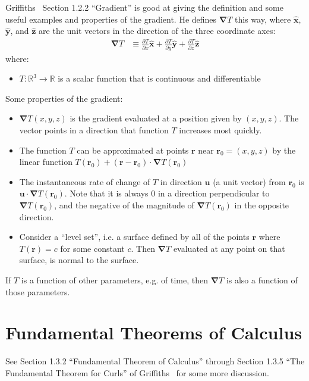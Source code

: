 \documentclass[a4paper]{article}
\theoremstyle{plain}
\theoremstyle{definition}
\newcommand{\vect}[1]{\textbf{#1}}
\newcommand{\hatvec}[1]{\hat{\textbf{#1}}}
\newcommand{\reals}{\mathbb{R}}
\newcommand{\del}{\bm{\nabla}}
\begin{document}
Griffiths~\cite{Griffiths1998} Section 1.2.2 ``Gradient'' is good at
giving the definition and some useful examples and properties of the
gradient.  He defines $\del T$ this way, where $\hatvec{x}$,
$\hatvec{y}$, and $\hatvec{z}$ are the unit vectors in the direction
of the three coordinate axes:
\begin{align*}
  \del T & \equiv \frac{\partial T}{\partial x} \hatvec{x}
                + \frac{\partial T}{\partial y} \hatvec{y}
                + \frac{\partial T}{\partial z} \hatvec{z}
\end{align*}
where:
\begin{itemize}
  \item $T : \reals^3 \rightarrow \reals$ is a scalar function that is
    continuous and differentiable
\end{itemize}
Some properties of the gradient:
\begin{itemize}
  \item $\del T(x, y, z)$ is the gradient evaluated at a position
    given by $(x, y, z)$.  The vector points in a direction that
    function $T$ increases most quickly.
  \item The function $T$ can be approximated at points $\vect{r}$ near
    $\vect{r}_0 = (x, y, z)$ by the linear function $T(\vect{r}_0) +
    (\vect{r} - \vect{r}_0) \cdot \del T(\vect{r}_0)$
  \item The instantaneous rate of change of $T$ in direction
    $\vect{u}$ (a unit vector) from $\vect{r}_0$ is $\vect{u} \cdot
    \del T(\vect{r}_0)$.  Note that it is always 0 in a direction
    perpendicular to $\del T(\vect{r}_0)$, and the negative of the
    magnitude of $\del T(\vect{r}_0)$ in the opposite direction.
  \item Consider a ``level set'', i.e. a surface defined by all of the
    points $\vect{r}$ where $T(\vect{r})=c$ for some constant $c$.
    Then $\del T$ evaluated at any point on that surface, is normal
    to the surface.
\end{itemize}

If $T$ is a function of other parameters, e.g. of time, then $\del T$
is also a function of those parameters.


\section{Fundamental Theorems of Calculus}

See Section 1.3.2 ``Fundamental Theorem of Calculus'' through Section
1.3.5 ``The Fundamental Theorem for Curls'' of
Griffiths~\cite{Griffiths1998} for some more discussion.
\end{document}
